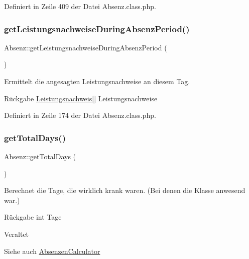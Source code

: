 Definiert in Zeile 409 der Datei Absenz.\+class.\+php.

\mbox{\label{class_absenz_adaf39e6382e9a347ea2424c98eeda828}} 
\subsubsection{\texorpdfstring{get\+Leistungsnachweise\+During\+Absenz\+Period()}{getLeistungsnachweiseDuringAbsenzPeriod()}}
{\footnotesize\ttfamily Absenz\+::get\+Leistungsnachweise\+During\+Absenz\+Period (\begin{DoxyParamCaption}{ }\end{DoxyParamCaption})}

Ermittelt die angesagten Leistungsnachweise an diesem Tag. \begin{DoxyReturn}{Rückgabe}
\mbox{\hyperlink{class_leistungsnachweis}{Leistungsnachweis}}\mbox{[}\mbox{]} Leistungsnachweise 
\end{DoxyReturn}


Definiert in Zeile 174 der Datei Absenz.\+class.\+php.

\mbox{\label{class_absenz_a1dbf5afdb32a6e1b7450cd71997c37ea}} 
\subsubsection{\texorpdfstring{get\+Total\+Days()}{getTotalDays()}}
{\footnotesize\ttfamily Absenz\+::get\+Total\+Days (\begin{DoxyParamCaption}{ }\end{DoxyParamCaption})}

Berechnet die Tage, die wirklich krank waren. (Bei denen die Klasse anwesend war.) \begin{DoxyReturn}{Rückgabe}
int Tage 
\end{DoxyReturn}
\begin{DoxyRefDesc}{Veraltet}
\item[\mbox{\hyperlink{deprecated__deprecated000010}{Veraltet}}]\end{DoxyRefDesc}
\begin{DoxySeeAlso}{Siehe auch}
\mbox{\hyperlink{class_absenzen_calculator}{Absenzen\+Calculator}} 
\end{DoxySeeAlso}


